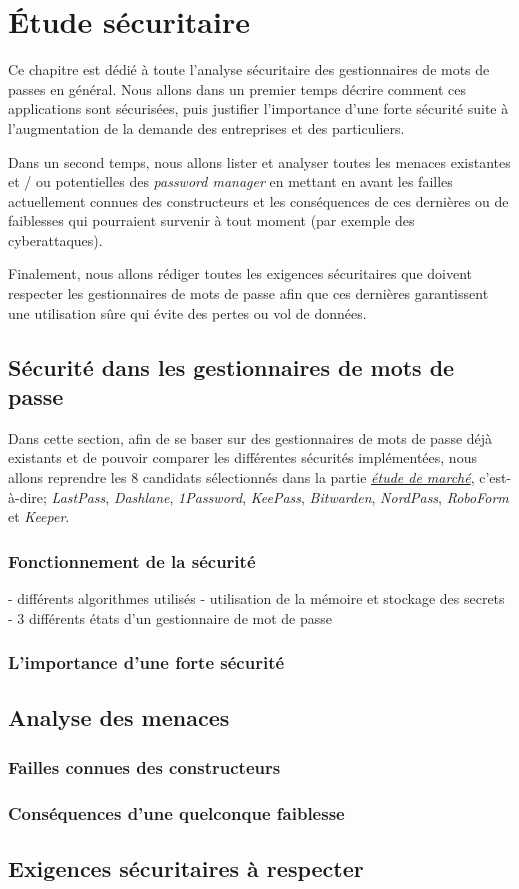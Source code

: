 
\chapter{Étude sécuritaire}
\label{ch:etude_secu}

Ce chapitre est dédié à toute l'analyse sécuritaire des gestionnaires de mots de passes en général. Nous allons dans un premier temps décrire comment ces applications sont sécurisées, puis justifier l'importance d'une forte sécurité suite à l'augmentation de la demande des entreprises et des particuliers.

Dans un second temps, nous allons lister et analyser toutes les menaces existantes et / ou potentielles des \textit{password manager} en mettant en avant les failles actuellement connues des constructeurs et les conséquences de ces dernières ou de faiblesses qui pourraient survenir à tout moment (par exemple des cyberattaques).

Finalement, nous allons rédiger toutes les exigences sécuritaires que doivent respecter les gestionnaires de mots de passe afin que ces dernières garantissent une utilisation sûre qui évite des pertes ou vol de données.

\section{Sécurité dans les gestionnaires de mots de passe}

Dans cette section, afin de se baser sur des gestionnaires de mots de passe déjà existants et de pouvoir comparer les différentes sécurités implémentées, nous allons reprendre les 8 candidats sélectionnés dans la partie \hyperref[ch:etude_marche]{\textit{étude de marché}}, c'est-à-dire; \textit{LastPass}, \textit{Dashlane}, \textit{1Password}, \textit{KeePass}, \textit{Bitwarden}, \textit{NordPass}, \textit{RoboForm} et \textit{Keeper}.
\subsection{Fonctionnement de la sécurité}
- différents algorithmes utilisés
- utilisation de la mémoire et stockage des secrets
- 3 différents états d'un gestionnaire de mot de passe
\subsection{L'importance d'une forte sécurité}
\section{Analyse des menaces}
\subsection{Failles connues des constructeurs}
\subsection{Conséquences d'une quelconque faiblesse}
\section{Exigences sécuritaires à respecter}
